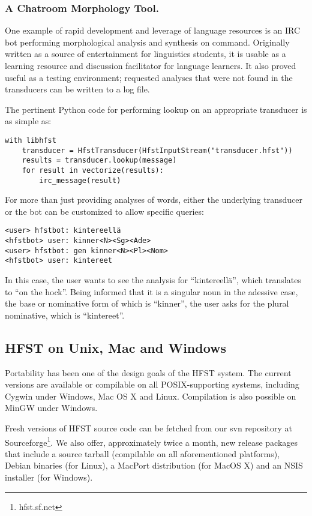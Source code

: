 \documentclass{llncs}
\begin{document}
\subsubsection{A Chatroom Morphology Tool.}
One example of rapid development and leverage of language resources is
an IRC bot performing morphological analysis and synthesis on command.
Originally written as a source of entertainment for linguistics students,
it is usable as a learning resource and discussion facilitator for
language learners. It also proved useful as a testing environment;
requested analyses that were not found in the transducers can be written to a
log file.

The pertinent Python code for performing lookup on an appropriate transducer
is as simple as:

\begin{verbatim}
with libhfst
    transducer = HfstTransducer(HfstInputStream("transducer.hfst"))
    results = transducer.lookup(message)
    for result in vectorize(results):
        irc_message(result)
\end{verbatim}

For more than just providing analyses of words, either the underlying transducer
or the bot can be customized to allow specific queries:

\begin{verbatim}
<user> hfstbot: kintereellä
<hfstbot> user: kinner<N><Sg><Ade>
<user> hfstbot: gen kinner<N><Pl><Nom>
<hfstbot> user: kintereet
\end{verbatim}

In this case, the user wants to see the analysis for ``kintereellä'',
which translates to ``on the hock''. Being informed that it is
a singular noun in the adessive case, the base or nominative form of which
is ``kinner'', the user asks for the plural nominative, which is ``kintereet''.

\subsection{HFST on Unix, Mac and Windows}

Portability has been one of the design goals of the HFST system. The
current versions are available or compilable on all POSIX-supporting
systems, including Cygwin under Windows, Mac OS X and Linux. 
Compilation is also possible on MinGW under Windows.

Fresh versions of HFST source code can be fetched from our svn
repository at Sourceforge\footnote{hfst.sf.net}. We also offer, approximately twice a month, new
release packages that include a source tarball (compilable on all
aforementioned platforms), Debian binaries (for Linux), a MacPort
distribution (for MacOS X) and an NSIS installer (for Windows).
\end{document}
